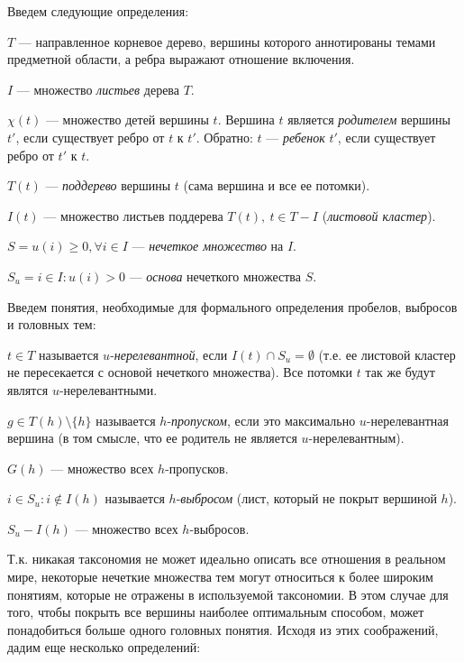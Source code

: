 \documentclass[12pt]{article}
\newenvironment{itemize*}%
{\begin{itemize}%
		\setlength{\itemsep}{0pt}%
		\setlength{\parskip}{0pt}}%
	{\end{itemize}}
\begin{document}
Введем следующие определения:
\begin{itemize*}
	\item $T$ --- направленное корневое дерево, вершины которого аннотированы темами предметной области, а ребра выражают отношение включения.
	\item $I$ --- множество \textit{листьев} дерева $T$.
	\item $\chi(t)$ --- множество детей вершины $t$. Вершина $t$ является \textit{родителем} вершины $t'$, если существует ребро от $t$ к $t'$. Обратно: $t$ --- \textit{ребенок} $t'$, если существует ребро от $t'$ к $t$.
	\item $T(t)$ --- \textit{поддерево} вершины $t$ (сама вершина и все ее потомки).
	\item $I(t)$ --- множество листьев поддерева $T(t), \ t\in T-I$ (\textit{листовой кластер}).
	
	\item $S={u(i)\geq0,\forall i\in I}$ --- \textit{нечеткое множество} на $I$.
	\item $S_u={i\in I: u(i)>0}$ --- \textit{основа} нечеткого множества $S$.
\end{itemize*}

Введем понятия, необходимые для формального определения пробелов, выбросов и головных тем: 
\begin{itemize*}
	\item $t\in T$ называется $u$-\textit{нерелевантной}, если $I(t) \cap S_u=\emptyset$ (т.е. ее листовой кластер не пересекается с основой нечеткого множества).
	Все потомки $t$ так же будут являтся $u$-нерелевантными.
	\item $g\in T(h)\setminus\{h\}$ называется $h$-\textit{пропуском}, если это максимально $u$-нерелевантная вершина (в том смысле, что ее родитель не является $u$-нерелевантным). 
	\item $G(h)$ --- множество всех $h$-пропусков.
	\item $i\in S_u: i\notin I(h)$ называется $h$-\textit{выбросом} (лист, который не покрыт вершиной $h$).
	\item $S_u -I(h)$ --- множество всех $h$-выбросов.
\end{itemize*}

Т.к. никакая таксономия не может идеально описать все отношения в реальном мире, некоторые нечеткие множества тем могут относиться к более широким понятиям, которые не отражены в используемой таксономии. В этом случае для того, чтобы покрыть все вершины наиболее оптимальным способом, может понадобиться больше одного головных понятия. Исходя из этих соображений, дадим еще несколько определений:
\end{document}
